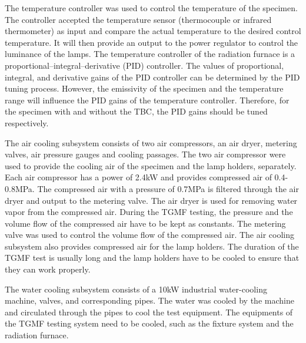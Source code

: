 The temperature controller was used to control the temperature of the specimen.
The controller accepted the temperature sensor (thermocouple or infrared thermometer) as input and compare the actual temperature to the desired control temperature. It will then provide an output to the power regulator to control the luminance of the lamps. 
The temperature controller of the radiation furnace is a proportional–integral–derivative (PID) controller. The values of proportional, integral, and derivative gains of the PID controller can be determined by the PID tuning process.
However, the emissivity of the specimen and the temperature range will influence the PID gains of the temperature controller. Therefore, for the specimen with and without the TBC, the PID gains should be tuned respectively.

The air cooling subsystem consists of two air compressors, an air dryer, metering valves, air pressure gauges and cooling passages. 
The two air compressor were used to provide the cooling air of the specimen and the lamp holders, separately.
Each air compressor has a power of 2.4kW and provides compressed air of 0.4-0.8MPa. The compressed air with a pressure of 0.7MPa is filtered through the air dryer and output to the metering valve. The air dryer is used for removing water vapor from the compressed air.
During the TGMF testing, the pressure and the volume flow of the compressed air have to be kept as constants. The metering valve was used to control the volume flow of the compressed air.
The air cooling subsystem also provides compressed air for the lamp holders.
The duration of the TGMF test is usually long and the lamp holders have to be cooled to ensure that they can work properly.

The water cooling subsystem consists of a 10kW industrial water-cooling machine, valves, and corresponding pipes. 
The water was cooled by the machine and circulated through the pipes to cool the test equipment. 
The equipments of the TGMF testing system need to be cooled, such as the fixture system and the radiation furnace.




